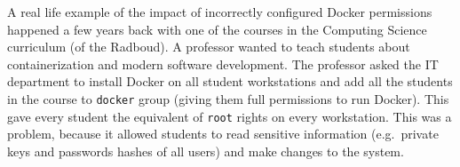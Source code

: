 \medskip

A real life example of the impact of incorrectly configured Docker permissions happened a few years back with one of the courses in the Computing Science curriculum (of the Radboud). A professor wanted to teach students about containerization and modern software development. The professor asked the IT department to install Docker on all student workstations and add all the students in the course to \lstinline{docker} group (giving them full permissions to run Docker). This gave every student the equivalent of \lstinline{root} rights on every workstation. This was a problem, because it allowed students to read sensitive information (e.g.\ private keys and passwords hashes of all users) and make changes to the system.
